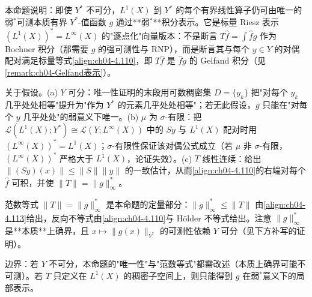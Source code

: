 \documentclass[../../main.tex]{subfiles}%
\begin{document}
\begin{remark}\label{remark:ch04-弱星Gelfand表示}
本命题说明：即使 $Y^*$ 不可分，$L^1(X)$ 到 $Y^*$ 的每个有界线性算子仍可由唯一的弱$^*$可测本质有界 $Y^*$-值函数 $g$ 通过**弱$^*$**积分表示。它是标量 Riesz 表示 $(L^1(X))^*=L^\infty(X)$ 的"逐点化"向量版本：不是断言 $T\hat f=\int\hat fg$ 作为 Bochner 积分（那需要 $g$ 的强可测性与 RNP），而是断言其与每个 $y\in Y$ 的对偶配对满足标量等式\eqref{align:ch04-4.110}，即 $T\hat f$ 是 $\hat fg$ 的 Gelfand 积分（见\cref{remark:ch04-Gelfand表示}）。

关于假设。(a) $Y$ 可分：唯一性证明的末段用可数稠密集 $D=\{y_k\}$ 把"对每个 $y_k$ 几乎处处相等"提升为"作为 $Y^*$ 的元素几乎处处相等"；若无此假设，$g$ 只能在"对每个 $y$ 几乎处处"的弱意义下唯一。(b) $\mu$ 为 $\sigma$-有限：把 $\mathcal{L}(L^1(X);Y^*)\cong\mathcal{L}(Y;L^\infty(X))$ 中的 $Sy$ 与 $L^1(X)$ 配对时用 $(L^\infty(X))^*=L^1(X)$；$\sigma$-有限性保证该对偶公式成立（若 $\mu$ 非 $\sigma$-有限，$(L^\infty(X))^*$ 严格大于 $L^1(X)$，论证失效）。(c) $T$ 线性连续：给出 $\|(Sy)(x)\|\leqslant\|S\|\|y\|$ 的一致估计，从而\eqref{align:ch04-4.110}的右端对每个 $\hat f$ 可积，并使 $\|T\|=\|g\|_\infty^*$。

范数等式 $\|T\|=\|g\|_\infty^*$ 是本命题的定量部分：$\|g\|_\infty^*\leqslant\|T\|$ 由\eqref{align:ch04-4.113}给出，反向不等式由\eqref{align:ch04-4.110}与 Hölder 不等式给出。注意 $\|g\|_\infty^*$ 是**本质**上确界，且 $x\mapsto\|g(x)\|_{Y^*}$ 的可测性依赖 $Y$ 可分（见下方补写的证明）。

边界：若 $Y$ 不可分，本命题的"唯一性"与"范数等式"都需改述（本质上确界可能不可测）。若 $T$ 只定义在 $L^1(X)$ 的稠密子空间上，则只能得到 $g$ 在弱$^*$意义下的局部表示。
\end{remark}
\end{document}
